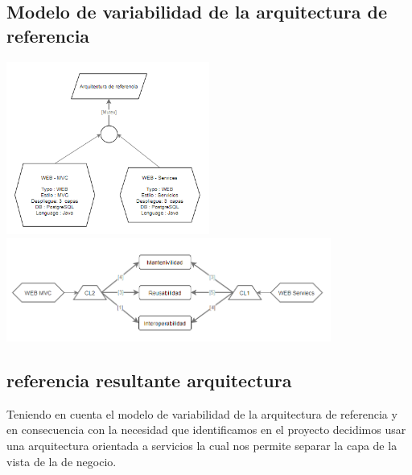 \documentclass[10pt,a4paper,openany]{book}
\begin{document}
\subsection{Modelo de variabilidad de la arquitectura de referencia}
\begin{center}
\includegraphics[width=0.5\textwidth]{model1}\\
\includegraphics[width=0.8\textwidth]{model2}
\end{center}

\subsection{referencia resultante arquitectura}
Teniendo en cuenta el modelo de variabilidad de la arquitectura de referencia y en consecuencia con la necesidad que identificamos en el proyecto decidimos usar una arquitectura orientada a servicios la cual nos permite separar la capa de la vista de la de negocio.
\end{document}
